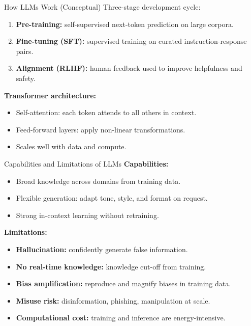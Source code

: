 \documentclass[10pt]{beamer}
\begin{document}
\begin{frame}{How LLMs Work (Conceptual)}
    Three-stage development cycle:
    \begin{enumerate}
        \item \textbf{Pre-training:} self-supervised next-token prediction on large corpora.
        \item \textbf{Fine-tuning (SFT):} supervised training on curated instruction-response pairs.
        \item \textbf{Alignment (RLHF):} human feedback used to improve helpfulness and safety.
    \end{enumerate}

    \vspace{0.2cm}
    \textbf{Transformer architecture:}
    \begin{itemize}
        \item Self-attention: each token attends to all others in context.
        \item Feed-forward layers: apply non-linear transformations.
        \item Scales well with data and compute.
    \end{itemize}
\end{frame}

\begin{frame}{Capabilities and Limitations of LLMs}
    \textbf{Capabilities:}
    \begin{itemize}
        \item Broad knowledge across domains from training data.
        \item Flexible generation: adapt tone, style, and format on request.
        \item Strong in-context learning without retraining.
    \end{itemize}

    \vspace{0.2cm}
    \textbf{Limitations:}
    \begin{itemize}
        \item \textbf{Hallucination:} confidently generate false information.
        \item \textbf{No real-time knowledge:} knowledge cut-off from training.
        \item \textbf{Bias amplification:} reproduce and magnify biases in training data.
        \item \textbf{Misuse risk:} disinformation, phishing, manipulation at scale.
        \item \textbf{Computational cost:} training and inference are energy-intensive.
    \end{itemize}
\end{frame}
\end{document}
